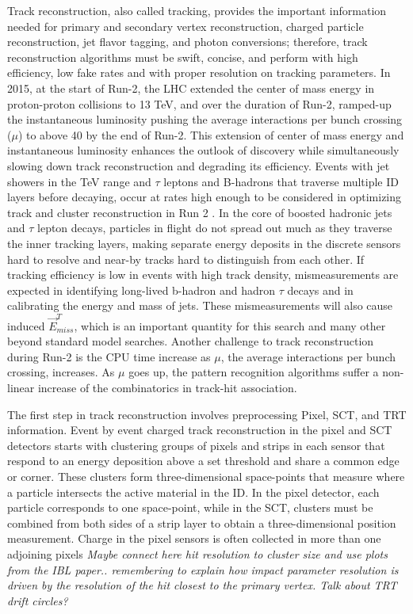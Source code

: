 Track reconstruction, also called tracking, provides the important information needed for primary and secondary vertex reconstruction, charged particle reconstruction, jet flavor tagging, and photon conversions; therefore, track reconstruction algorithms must be swift, concise, and perform with high efficiency, low fake rates and with proper resolution on tracking parameters.  In 2015, at the start of Run-2, the LHC extended the center of mass energy in proton-proton collisions to 13 TeV, and over the duration of Run-2, ramped-up the instantaneous luminosity pushing the average interactions per bunch crossing ($\mu$) to above 40 by the end of Run-2.  This extension of center of mass energy and instantaneous luminosity enhances the outlook of discovery while simultaneously slowing down track reconstruction and degrading its efficiency.  Events with jet showers in the TeV range and $\tau$ leptons and B-hadrons that traverse multiple ID layers before decaying, occur at rates high enough to be considered in optimizing track and cluster reconstruction in Run 2 \cite{aad}.  In the core of boosted hadronic jets and $\tau$ lepton decays, particles in flight do not spread out much as they traverse the inner tracking layers, making separate energy deposits in the discrete sensors hard to resolve and near-by tracks hard to distinguish from each other.  If tracking efficiency is low in events with high track density, mismeasurements are expected in identifying long-lived b-hadron and hadron $\tau$ decays and in calibrating the energy and mass of jets.  These mismeasurements will also cause induced $\vec{E}^T_{miss}$, which is an important quantity for this search and many other beyond standard model searches.  Another challenge to track reconstruction during Run-2 is the CPU time increase as $\mu$, the average interactions per bunch crossing, increases.  As $\mu$ goes up, the pattern recognition algorithms suffer a non-linear increase of the combinatorics in track-hit association.  

The first step in track reconstruction involves preprocessing Pixel, SCT, and TRT information. Event by event charged track reconstruction in the pixel and SCT detectors starts with clustering groups of pixels and strips in each sensor that respond to an energy deposition above a set threshold and share a common edge or corner.  These clusters form three-dimensional space-points that measure where a particle intersects the active material in the ID.  In the pixel detector, each particle corresponds to one space-point, while in the SCT, clusters must be combined from both sides of a strip layer to obtain a three-dimensional position measurement.  Charge in the pixel sensors is often collected in more than one adjoining pixels \textit{Maybe connect here hit resolution to cluster size and use plots from the IBL paper.. remembering to explain how impact parameter resolution is driven by the resolution of the hit closest to the primary vertex.  Talk about TRT drift circles?}

